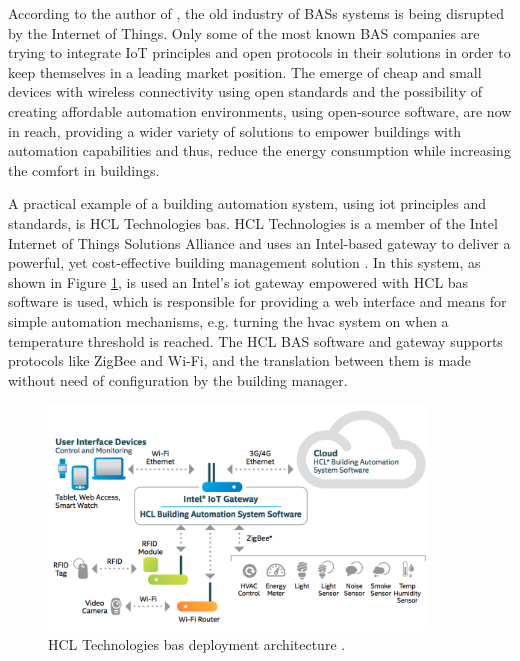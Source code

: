According to the author of \cite{TransformativeWave}, the old industry of BASs systems is being disrupted by the Internet of Things. Only some of the most known BAS companies are trying to integrate IoT principles and open protocols in their solutions in order to keep themselves in a leading market position. The emerge of cheap and small devices with wireless connectivity using open standards and the possibility of creating affordable automation environments, using open-source software, are now in reach, providing a wider variety of solutions to empower buildings with automation capabilities and thus, reduce the energy consumption while increasing the comfort in buildings.

A practical example of a building automation system, using \ac{iot} principles and standards, is HCL Technologies \ac{bas}. HCL Technologies is a member of the Intel Internet of Things Solutions Alliance \cite{intel} and uses an Intel-based gateway to deliver a powerful, yet cost-effective building management solution \cite{hcl}. In this system, as shown in Figure \ref{fig:intel}, is used an Intel's \ac{iot} gateway empowered with HCL \ac{bas} software is used, which is responsible for providing a web interface and means for simple automation mechanisms, e.g. turning the \acf{hvac} system on when a temperature threshold is reached. The HCL BAS software and gateway supports protocols like ZigBee and Wi-Fi, and the translation between them is made without need of configuration by the building manager.



\begin{figure}[H]
	\centering
	\includegraphics[width=0.9\textwidth]{figures/intelhclarch.png}
	\caption{HCL Technologies \ac{bas} deployment architecture \cite{hcl}.}
	\label{fig:intel}
\end{figure}

